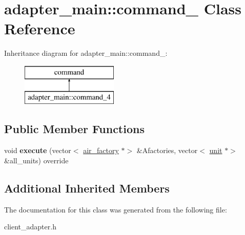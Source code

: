 \hypertarget{classadapter__main_1_1command__4}{}\section{adapter\+\_\+main\+:\+:command\+\_ Class Reference}
\label{classadapter__main_1_1command__4}
Inheritance diagram for adapter\+\_\+main\+:\+:command\+\_\+:\begin{figure}[H]
\begin{center}
\leavevmode
\includegraphics[height=2.000000cm]{classadapter__main_1_1command__4}
\end{center}
\end{figure}
\subsection*{Public Member Functions}
\begin{DoxyCompactItemize}
\item 
\mbox{\label{classadapter__main_1_1command__4_ad42743cae2ca979bc520bf0e3840018d}} 
void {\bfseries execute} (vector$<$ \mbox{\hyperlink{classair__factory}{air\+\_\+factory}} $\ast$$>$ \&Afactories, vector$<$ \mbox{\hyperlink{classunit}{unit}} $\ast$$>$ \&all\+\_\+units) override
\end{DoxyCompactItemize}
\subsection*{Additional Inherited Members}


The documentation for this class was generated from the following file\+:\begin{DoxyCompactItemize}
\item 
client\+\_\+adapter.\+h\end{DoxyCompactItemize}
